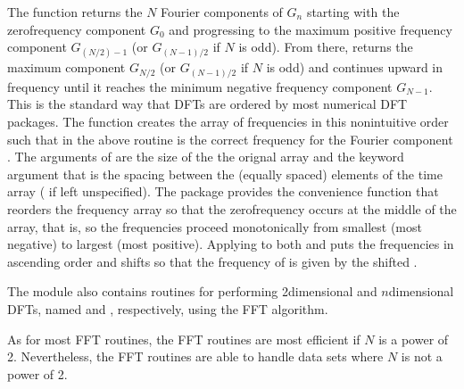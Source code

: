\documentclass[letterpaper,10pt,english]{sphinxmanual}
\begin{document}
\sphinxAtStartPar
The  function returns the \(N\) Fourier components of \(G_n\) starting with the zero\sphinxhyphen{}frequency component \(G_0\) and progressing to the maximum positive frequency component \(G_{(N/2)-1}\) (or \(G_{(N-1)/2}\) if \(N\) is odd).  From there,  returns the maximum  component \(G_{N/2}\)  (or \(G_{(N-1)/2}\) if \(N\) is odd) and continues upward in frequency until it reaches the minimum negative frequency component \(G_{N-1}\).  This is the standard way that DFTs are ordered by most numerical DFT packages.  The  function  creates the array of frequencies in this non\sphinxhyphen{}intuitive order such that  in the above routine is the correct frequency for the Fourier component .  The arguments of  are the size of the the orignal array  and the keyword argument  that is the spacing between the (equally spaced) elements of the time array ( if left unspecified).  The package  provides the convenience function  that reorders the frequency array so that the zero\sphinxhyphen{}frequency occurs at the middle of the array, that is, so the frequencies proceed monotonically from smallest (most negative) to largest (most positive).  Applying  to both  and  puts the frequencies  in ascending order and shifts  so that the frequency of  is given by the shifted .

\sphinxAtStartPar
The  module also contains routines for performing 2\sphinxhyphen{}dimensional and \(n\)\sphinxhyphen{}dimensional DFTs, named  and , respectively, using the FFT algorithm.

\sphinxAtStartPar
As for most FFT routines, the  FFT routines are most efficient if \(N\) is a power of 2.  Nevertheless, the FFT routines are able to handle data sets where \(N\) is not a power of 2.
\end{document}
